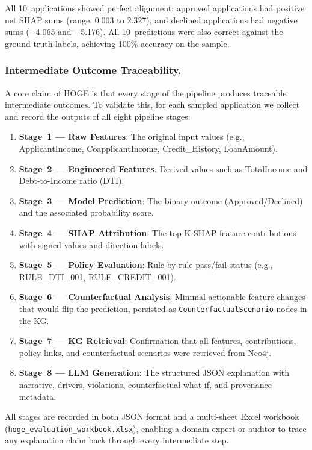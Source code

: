 \documentclass[lnbip]{svmultln}
\begin{document}
All 10~applications showed perfect alignment: approved applications had positive net SHAP sums (range: 0.003 to 2.327), and declined applications had negative sums ($-$4.065 and $-$5.176). All 10~predictions were also correct against the ground-truth labels, achieving 100\% accuracy on the sample.

\subsubsection{Intermediate Outcome Traceability.}

A core claim of HOGE is that every stage of the pipeline produces traceable intermediate outcomes. To validate this, for each sampled application we collect and record the outputs of all eight pipeline stages:

\begin{enumerate}
    \item \textbf{Stage~1 --- Raw Features}: The original input values (e.g., ApplicantIncome, CoapplicantIncome, Credit\_History, LoanAmount).
    \item \textbf{Stage~2 --- Engineered Features}: Derived values such as TotalIncome and Debt-to-Income ratio (DTI).
    \item \textbf{Stage~3 --- Model Prediction}: The binary outcome (Approved/Declined) and the associated probability score.
    \item \textbf{Stage~4 --- SHAP Attribution}: The top-K SHAP feature contributions with signed values and direction labels.
    \item \textbf{Stage~5 --- Policy Evaluation}: Rule-by-rule pass/fail status (e.g., RULE\_DTI\_001, RULE\_CREDIT\_001).
    \item \textbf{Stage~6 --- Counterfactual Analysis}: Minimal actionable feature changes that would flip the prediction, persisted as \texttt{CounterfactualScenario} nodes in the KG.
    \item \textbf{Stage~7 --- KG Retrieval}: Confirmation that all features, contributions, policy links, and counterfactual scenarios were retrieved from Neo4j.
    \item \textbf{Stage~8 --- LLM Generation}: The structured JSON explanation with narrative, drivers, violations, counterfactual what-if, and provenance metadata.
\end{enumerate}

All stages are recorded in both JSON format and a multi-sheet Excel workbook (\texttt{hoge\_evaluation\_workbook.xlsx}), enabling a domain expert or auditor to trace any explanation claim back through every intermediate step.
\end{document}
